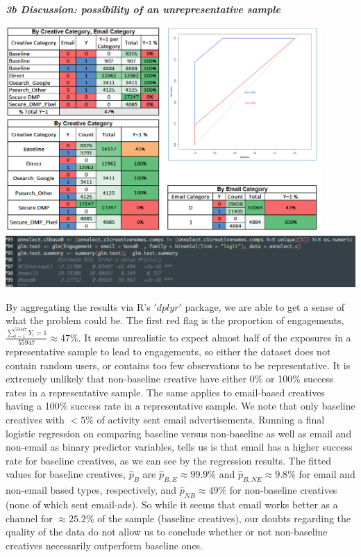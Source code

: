 \documentclass[10pt, oneside,spanish]{article}
\begin{document}
\pagebreak
\textbf{\textit{3b Discussion: possibility of an unrepresentative sample}}
\begin{center}
\includegraphics[width=12cm]{3results.png}
\includegraphics[width=14cm]{base0.png}
\end{center}

By aggregating the results via R's $'dplyr'$ package, we are able to get a sense of what the problem could be. The first red flag is the proportion of engagements, $\frac{\sum_{i=1}^{55947} Y_i = 1}{55947} \approx 47\%$. It seems unrealistic to expect almost half of the exposures in a representative sample to lead to engagements, so either the dataset does not contain random users, or contains too few observations to be representative. It is extremely unlikely that non-baseline creative have either 0\% or 100\% success rates in a representative sample. The same applies to email-based creatives having a 100\% success rate in a representative sample. We note that only baseline creatives with $<5\%$ of activity sent email advertisements. Running a final logistic regression on comparing baseline versus non-baseline as well as email and non-email as binary predictor variables, tells us is that email has a higher success rate for baseline creatives, as we can see by the regression results. The fitted values for baseline creatives, $\hat{p}_{B}$ are $\hat{p}_{B,E} \approx  99.9\% $ and $ \hat{p}_{B,NE}  \approx 9.8\%$ for email and non-email based types, respectively, and $ \hat{p}_{NB} \approx 49\% $ for non-baseline creatives (none of which sent email-ads). So while it seems that email works better as a channel for $\approx 25.2\% $ of the sample (baseline creatives), our doubts regarding the quality of the data do not allow us to conclude whether or not non-baseline creatives necessarily outperform baseline ones. 
\end{document}
